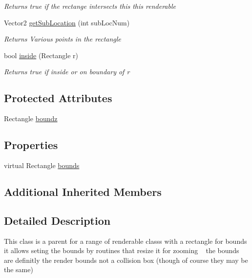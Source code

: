 \begin{DoxyCompactItemize}
\begin{DoxyCompactList}\small\item\em Returns true if the rectange intersects this this renderable \end{DoxyCompactList}\item 
Vector2 \mbox{\hyperlink{class_r_c___framework_1_1_r_c___renderable_bounded_a93bf68209b9cf3bce7cbbd8eb02d6e1a}{get\+Sub\+Location}} (int sub\+Loc\+Num)
\begin{DoxyCompactList}\small\item\em Returns Various points in the rectangle \end{DoxyCompactList}\item 
bool \mbox{\hyperlink{class_r_c___framework_1_1_r_c___renderable_bounded_a126c01971f9ab5ac288b84aa985117e1}{inside}} (Rectangle r)
\begin{DoxyCompactList}\small\item\em Returns true if inside or on boundary of r \end{DoxyCompactList}\end{DoxyCompactItemize}
\subsection*{Protected Attributes}
\begin{DoxyCompactItemize}
\item 
Rectangle \mbox{\hyperlink{class_r_c___framework_1_1_r_c___renderable_bounded_aabcb0f8cd56a2e7b6209f8530194aff1}{boundz}}
\end{DoxyCompactItemize}
\subsection*{Properties}
\begin{DoxyCompactItemize}
\item 
virtual Rectangle \mbox{\hyperlink{class_r_c___framework_1_1_r_c___renderable_bounded_a64a3cd64146d7e7bc5897e5a849f158f}{bounds}}
\end{DoxyCompactItemize}
\subsection*{Additional Inherited Members}


\subsection{Detailed Description}
This class is a parent for a range of renderable class\textquotesingle{}s with a rectangle for bounds it allows seting the bounds by routines that resize it for zooming ~\newline
the bounds are definitly the render bounds not a collision box (though of course they may be the same) 



